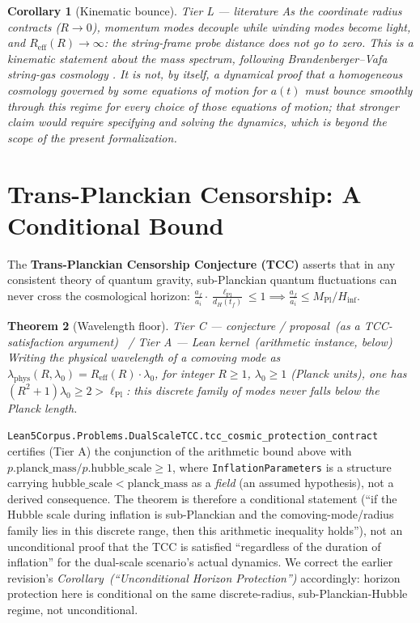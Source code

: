 \documentclass[11pt,a4paper]{article}
\newtheorem{theorem}{Theorem}[section]
\newtheorem{corollary}[theorem]{Corollary}
\theoremstyle{remark}
\newcommand{\tierA}{\colorbox{green!15}{\textsf{\scriptsize Tier A --- Lean kernel}}}
\newcommand{\tierL}{\colorbox{blue!10}{\textsf{\scriptsize Tier L --- literature}}}
\newcommand{\tierC}{\colorbox{orange!15}{\textsf{\scriptsize Tier C --- conjecture / proposal}}}
\begin{document}
\begin{corollary}[Kinematic bounce] \label{cor:bounce} \tierL
As the coordinate radius contracts ($R\to0$), momentum modes decouple while winding modes become
light, and $R_{\mathrm{eff}}(R)\to\infty$: the string-frame probe distance does not go to zero. This
is a \emph{kinematic} statement about the mass spectrum, following Brandenberger--Vafa string-gas
cosmology \cite{BrandenbergerVafa1989}. It is not, by itself, a dynamical proof that a homogeneous
cosmology governed by some equations of motion for $a(t)$ must bounce smoothly through this regime
for \emph{every} choice of those equations of motion; that stronger claim would require specifying
and solving the dynamics, which is beyond the scope of the present formalization.
\end{corollary}

\section{Trans-Planckian Censorship: A Conditional Bound}
\label{sec:tcc}

The \textbf{Trans-Planckian Censorship Conjecture (TCC)} \cite{BedroyaVafa2020} asserts that in any
consistent theory of quantum gravity, sub-Planckian quantum fluctuations can never cross the
cosmological horizon: $\tfrac{a_f}{a_i}\cdot\tfrac{\ell_{\mathrm{Pl}}}{d_H(t_f)} \le 1 \implies
\tfrac{a_f}{a_i} \le M_{\mathrm{Pl}}/H_{\mathrm{inf}}$.

\begin{theorem}[Wavelength floor] \label{thm:tcc} \tierC\ (as a TCC-satisfaction argument) \, /
\tierA\ (arithmetic instance, below)
Writing the physical wavelength of a comoving mode as $\lambda_{\mathrm{phys}}(R,\lambda_0) =
R_{\mathrm{eff}}(R)\cdot\lambda_0$, for integer $R\ge1$, $\lambda_0\ge1$ (Planck units), one has
$(R^2+1)\lambda_0 \ge 2 > \ell_{\mathrm{Pl}}$: this discrete family of modes never falls below the
Planck length.
\end{theorem}

\begin{scopebox}
\texttt{Lean5Corpus.Problems.DualScaleTCC.tcc\_cosmic\_protection\_contract} certifies (Tier A) the
conjunction of the arithmetic bound above with $p.\mathrm{planck\_mass}/p.\mathrm{hubble\_scale}\ge1$,
where \texttt{InflationParameters} is a structure carrying $\mathrm{hubble\_scale} <
\mathrm{planck\_mass}$ as a \emph{field} (an assumed hypothesis), not a derived consequence. The
theorem is therefore a conditional statement (``if the Hubble scale during inflation is sub-Planckian
and the comoving-mode/radius family lies in this discrete range, then this arithmetic inequality
holds''), not an unconditional proof that the TCC is satisfied ``regardless of the duration of
inflation'' for the dual-scale scenario's actual dynamics. We correct the earlier revision's
\emph{Corollary~(``Unconditional Horizon Protection'')} accordingly: horizon protection here is
conditional on the same discrete-radius, sub-Planckian-Hubble regime, not unconditional.
\end{scopebox}
\end{document}
